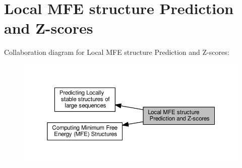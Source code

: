 \hypertarget{group__local__mfe__fold}{}\section{Local M\+F\+E structure Prediction and Z-\/scores}
\label{group__local__mfe__fold}
Collaboration diagram for Local M\+F\+E structure Prediction and Z-\/scores\+:
\nopagebreak
\begin{figure}[H]
\begin{center}
\leavevmode
\includegraphics[width=350pt]{group__local__mfe__fold}
\end{center}
\end{figure}
